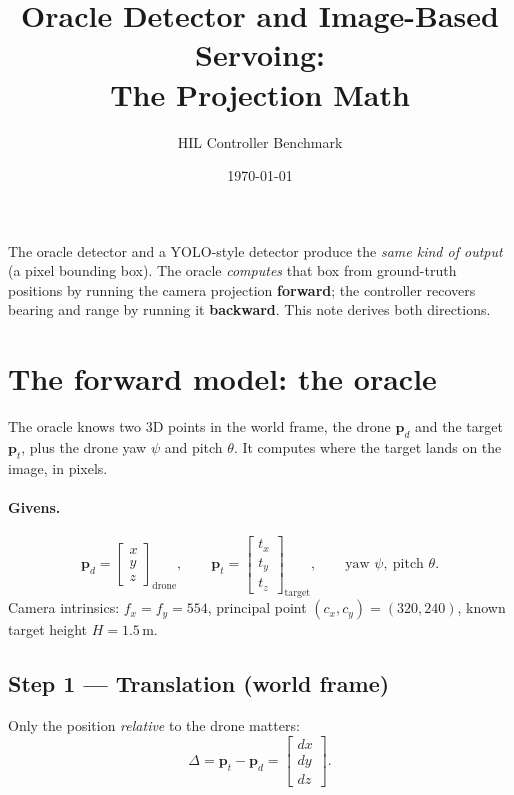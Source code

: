 \documentclass[11pt]{article}
\title{Oracle Detector and Image-Based Servoing:\\ The Projection Math}
\author{HIL Controller Benchmark}
\date{\today}
\newcommand{\pd}{\bm{p}_d}
\newcommand{\pt}{\bm{p}_t}
\begin{document}
\maketitle

\noindent
The oracle detector and a YOLO-style detector produce the \emph{same kind of
output} (a pixel bounding box). The oracle \emph{computes} that box from
ground-truth positions by running the camera projection \textbf{forward}; the
controller recovers bearing and range by running it \textbf{backward}. This note
derives both directions.

\section{The forward model: the oracle}

The oracle knows two 3D points in the world frame, the drone $\pd$ and the
target $\pt$, plus the drone yaw $\psi$ and pitch $\theta$. It computes where the
target lands on the image, in pixels.

\paragraph{Givens.}
\[
\pd = \begin{bmatrix} x \\ y \\ z \end{bmatrix}_{\text{drone}},\qquad
\pt = \begin{bmatrix} t_x \\ t_y \\ t_z \end{bmatrix}_{\text{target}},\qquad
\text{yaw } \psi,\ \text{pitch } \theta.
\]
Camera intrinsics: $f_x=f_y=554$, principal point $(c_x,c_y)=(320,240)$,
known target height $H=1.5\,\mathrm{m}$.

\subsection*{Step 1 — Translation (world frame)}
Only the position \emph{relative} to the drone matters:
\[
\Delta = \pt - \pd = \begin{bmatrix} dx \\ dy \\ dz \end{bmatrix}.
\]
\end{document}
